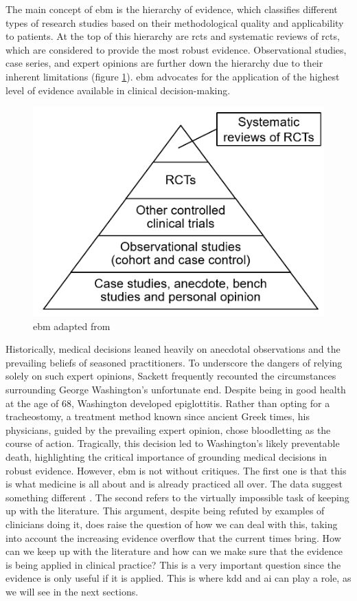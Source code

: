 The main concept of \ac{ebm} is the hierarchy of evidence, which classifies different types of research studies based on their methodological quality and applicability to patients. At the top of this hierarchy are \acp{rct} and systematic reviews of \acp{rct}, which are considered to provide the most robust evidence. Observational studies, case series, and expert opinions are further down the hierarchy due to their inherent limitations (figure \ref{fig:ebm}). \ac{ebm} advocates for the application of the highest level of evidence available in clinical decision-making.
\begin{figure}
    \centering
    \includegraphics[scale=0.55]{figures/ebm.png}
    
    \caption{\ac{ebm}  adapted from \cite{greenhalghHowReadPaper2019}} \label{fig:ebm}
    \end{figure}

Historically, medical decisions leaned heavily on anecdotal observations and the prevailing beliefs of seasoned practitioners. To underscore the dangers of relying solely on such expert opinions, Sackett frequently recounted the circumstances surrounding George Washington's unfortunate end. Despite being in good health at the age of 68, Washington developed epiglottitis. Rather than opting for a tracheostomy, a treatment method known since ancient Greek times, his physicians, guided by the prevailing expert opinion, chose bloodletting as the course of action. Tragically, this decision led to Washington's likely preventable death, highlighting the critical importance of grounding medical decisions in robust evidence.
However, \ac{ebm} is not without critiques. The first one is that this is what medicine is all about and is already practiced all over. The data suggest something different \cite{sackettEvidenceBasedMedicine1996}.
The second refers to the virtually impossible task of keeping up with the literature. This argument, despite being refuted by examples of clinicians doing it, does raise the question of how we can deal with this, taking into account the increasing evidence overflow that the current times bring. How can we keep up with the literature and how can we make sure that the evidence is being applied in clinical practice? This is a very important question since the evidence is only useful if it is applied. This is where \ac{kdd} and \ac{ai} can play a role, as we will see in the next sections. 


